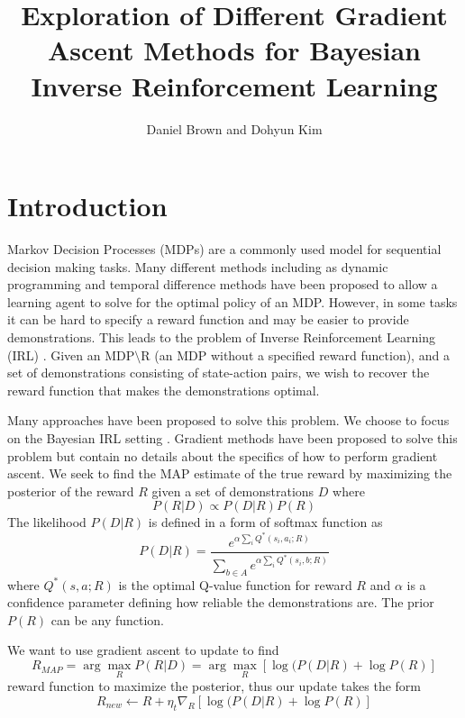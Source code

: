 \documentclass[10pt,a4paper]{article}
\author{Daniel Brown and Dohyun Kim}
\title{Exploration of Different Gradient Ascent Methods for Bayesian Inverse Reinforcement Learning}
\begin{document}
\maketitle

\section{Introduction}
Markov Decision Processes (MDPs) are a commonly used model for sequential decision making tasks. Many different methods including as dynamic programming and temporal difference methods have been proposed to allow a learning agent to solve for the optimal policy of an MDP. However, in some tasks it can be hard to specify a reward function and may be easier to provide demonstrations. This leads to the problem of Inverse Reinforcement Learning (IRL) \cite{ng2000algorithms}. Given an MDP$\setminus$R (an MDP without a specified reward function), and a set of demonstrations consisting of state-action pairs, we wish to recover the reward function that makes the demonstrations optimal. 

Many approaches have been proposed to solve this problem. We choose to focus on the Bayesian IRL setting \cite{ramachandran2007bayesian}. Gradient methods have been proposed to solve this problem \cite{lopes2009active,choi2011map} but contain no details about the specifics of how to perform gradient ascent. We seek to find the MAP estimate of the true reward by maximizing the posterior of the reward $R$ given a set of demonstrations $D$ where
\begin{equation}
P(R | D) \propto P(D | R) P(R)
\end{equation}
The likelihood $P(D|R)$ is defined in a form of softmax function \cite{sutton1998reinforcement} as 
\begin{equation}
P(D | R) = \frac{e^{\alpha \sum_i Q^*(s_i,a_i;R)}}{\sum_{b \in A} e^{\alpha \sum_i Q^*(s_i,b;R)}}
\end{equation}
where $Q^*(s,a; R)$ is the optimal Q-value function for reward $R$ and $\alpha$ is a confidence parameter defining how reliable the demonstrations are. The prior $P(R)$ can be any function. 

We want to use gradient ascent to update to find 
\begin{equation}
R_{MAP} = \arg \max_R  P(R | D) = \arg \max_R [\log(P(D|R) + \log P(R)]
\end{equation}
 reward function to maximize the posterior, thus our update takes the form
\begin{equation}
R_{new} \leftarrow R + \eta_t \nabla_R [\log(P(D|R) + \log P(R)]
\end{equation}
\end{document}
